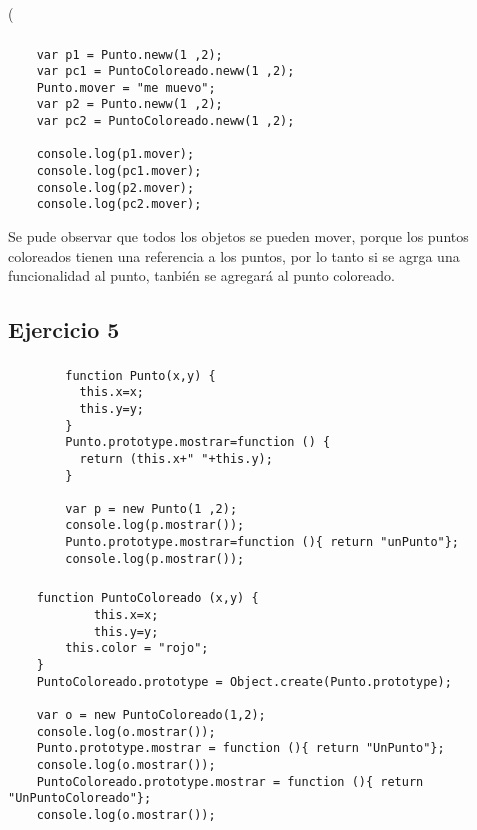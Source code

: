 \left( \documentclass[10pt,a4paper]{article}
\begin{document}
\subsubsection{}
    \begin{lstlisting}
    var p1 = Punto.neww(1 ,2);
    var pc1 = PuntoColoreado.neww(1 ,2);
    Punto.mover = "me muevo";
    var p2 = Punto.neww(1 ,2);
    var pc2 = PuntoColoreado.neww(1 ,2);

    console.log(p1.mover);
    console.log(pc1.mover);
    console.log(p2.mover);
    console.log(pc2.mover);
    \end{lstlisting}
    Se pude observar que todos los objetos se pueden mover, porque los puntos coloreados tienen una referencia a los puntos, por lo tanto si se agrga una funcionalidad al punto, tanbién se agregará al punto coloreado.
    
\subsection{Ejercicio 5}
\subsubsection{}
    \begin{lstlisting}
        function Punto(x,y) {
          this.x=x;
          this.y=y;
        }
        Punto.prototype.mostrar=function () {
          return (this.x+" "+this.y);
        }

        var p = new Punto(1 ,2);
        console.log(p.mostrar());
        Punto.prototype.mostrar=function (){ return "unPunto"};
        console.log(p.mostrar());
    \end{lstlisting}    
\subsubsection{}
	\begin{lstlisting}
	function PuntoColoreado (x,y) {
        	this.x=x;
        	this.y=y;
		this.color = "rojo";
	}
	PuntoColoreado.prototype = Object.create(Punto.prototype); 

	var o = new PuntoColoreado(1,2);
	console.log(o.mostrar());
	Punto.prototype.mostrar = function (){ return "UnPunto"};
	console.log(o.mostrar());
	PuntoColoreado.prototype.mostrar = function (){ return "UnPuntoColoreado"};
	console.log(o.mostrar());
	\end{lstlisting}
\end{document}
